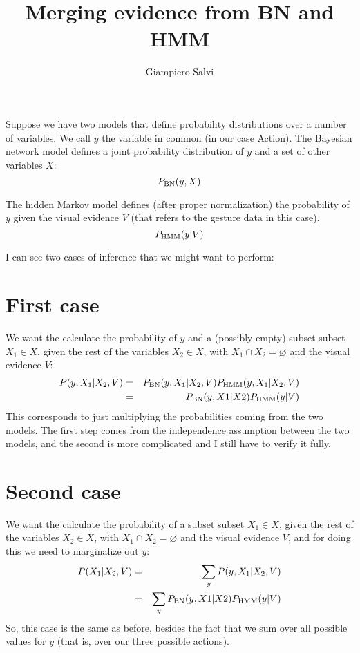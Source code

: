 \documentclass{article}
\title{Merging evidence from BN and HMM}
\author{Giampiero Salvi}
\begin{document}
\maketitle

\newcommand{\pbn}{\ensuremath P_{\scriptsize\mbox{BN}}}
\newcommand{\phmm}{\ensuremath P_{\scriptsize\mbox{HMM}}}

Suppose we have two models that define probability distributions over a number of variables.
We call $y$ the variable in common (in our case Action).
The Bayesian network model defines a joint probability distribution of $y$ and a set of other variables $X$:
\begin{equation}
\pbn(y,X)
\end{equation}

The hidden Markov model defines (after proper normalization) the probability of $y$ given the visual evidence $V$ (that refers to the gesture data in this case).
\begin{equation}
\phmm(y|V)
\end{equation}

I can see two cases of inference that we might want to perform:
\section{First case}
We want the calculate the probability of $y$ and a (possibly empty) subset subset $X_1 \in X$, given the rest of the variables $X_2\in X$, with $X_1 \cap X_2 = \varnothing$ and the visual evidence $V$:
\begin{eqnarray}
P(y, X_1|X_2, V) &=& \pbn(y, X_1|X_2,V)\phmm(y,X_1|X_2,V) \\
&=& \pbn(y,X1|X2)\phmm(y|V) \label{bn-hmm1}
\end{eqnarray}
This corresponds to just multiplying the probabilities coming from the two models.
The first step comes from the independence assumption between the two models, and the second is more complicated and I still have to verify it fully.

\section{Second case}
We want the calculate the probability of a subset subset $X_1 \in X$, given the rest of the variables $X_2\in X$, with $X_1 \cap X_2 = \varnothing$ and the visual evidence $V$, and for doing this we need to marginalize out $y$:
\begin{eqnarray}
P(X_1|X_2, V) &=& \sum_y P(y, X_1|X_2, V) \\
&=& \sum_y \pbn(y,X1|X2)\phmm(y|V) \label{bn-hmm2}
\end{eqnarray}
So, this case is the same as before, besides the fact that we sum over all possible values for $y$ (that is, over our three possible actions).
\end{document}
